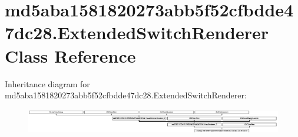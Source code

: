 \hypertarget{classmd5aba1581820273abb5f52cfbdde47dc28_1_1ExtendedSwitchRenderer}{}\section{md5aba1581820273abb5f52cfbdde47dc28.\+Extended\+Switch\+Renderer Class Reference}
\label{classmd5aba1581820273abb5f52cfbdde47dc28_1_1ExtendedSwitchRenderer}
Inheritance diagram for md5aba1581820273abb5f52cfbdde47dc28.\+Extended\+Switch\+Renderer\+:\begin{figure}[H]
\begin{center}
\leavevmode
\includegraphics[height=1.098039cm]{classmd5aba1581820273abb5f52cfbdde47dc28_1_1ExtendedSwitchRenderer}
\end{center}
\end{figure}
